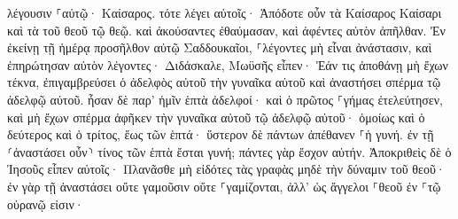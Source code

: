 \documentclass{openreader}
\begin{document}
λέγουσιν ⸀αὐτῷ· Καίσαρος. τότε λέγει αὐτοῖς· Ἀπόδοτε οὖν τὰ Καίσαρος Καίσαρι καὶ τὰ τοῦ θεοῦ τῷ θεῷ. 
καὶ ἀκούσαντες ἐθαύμασαν, καὶ ἀφέντες αὐτὸν ἀπῆλθαν. 
Ἐν ἐκείνῃ τῇ ἡμέρᾳ προσῆλθον αὐτῷ Σαδδουκαῖοι, ⸀λέγοντες μὴ εἶναι ἀνάστασιν, καὶ ἐπηρώτησαν αὐτὸν 
λέγοντες· Διδάσκαλε, Μωϋσῆς εἶπεν· Ἐάν τις ἀποθάνῃ μὴ ἔχων τέκνα, ἐπιγαμβρεύσει ὁ ἀδελφὸς αὐτοῦ τὴν γυναῖκα αὐτοῦ καὶ ἀναστήσει σπέρμα τῷ ἀδελφῷ αὐτοῦ. 
ἦσαν δὲ παρ’ ἡμῖν ἑπτὰ ἀδελφοί· καὶ ὁ πρῶτος ⸀γήμας ἐτελεύτησεν, καὶ μὴ ἔχων σπέρμα ἀφῆκεν τὴν γυναῖκα αὐτοῦ τῷ ἀδελφῷ αὐτοῦ· 
ὁμοίως καὶ ὁ δεύτερος καὶ ὁ τρίτος, ἕως τῶν ἑπτά· 
ὕστερον δὲ πάντων ἀπέθανεν ⸀ἡ γυνή. 
ἐν τῇ ⸂ἀναστάσει οὖν⸃ τίνος τῶν ἑπτὰ ἔσται γυνή; πάντες γὰρ ἔσχον αὐτήν. 
Ἀποκριθεὶς δὲ ὁ Ἰησοῦς εἶπεν αὐτοῖς· Πλανᾶσθε μὴ εἰδότες τὰς γραφὰς μηδὲ τὴν δύναμιν τοῦ θεοῦ· 
ἐν γὰρ τῇ ἀναστάσει οὔτε γαμοῦσιν οὔτε ⸀γαμίζονται, ἀλλ’ ὡς ἄγγελοι ⸀θεοῦ ἐν ⸀τῷ οὐρανῷ εἰσιν· 
\end{document}
